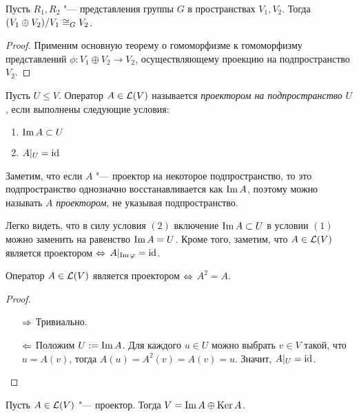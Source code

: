 \begin{proposition}
	Пусть $R_1, R_2$ "--- представления группы $G$ в пространствах $V_1, V_2$. Тогда $(V_1 \oplus V_2) / V_1 \cong_G V_2$.
\end{proposition}

\begin{proof}
	Применим основную теорему о гомоморфизме к гомоморфизму представлений $\phi: V_1 \oplus V_2 \to V_2$, осуществляющему проекцию на подпространство $V_2$.
\end{proof}

\begin{definition}
	Пусть $U \le V$. Оператор $A \in \mathcal L(V)$ называется \textit{проектором на подпространство} $U$, если выполнены следующие условия:
	\begin{enumerate}
		\item $\operatorname{Im} A \subset U$
		\item $A|_{U} = \mathrm{id}$
	\end{enumerate}

	Заметим, что если $A$ "--- проектор на некоторое подпространство, то это подпространство однозначно восстанавливается как $\operatorname{Im} A$, поэтому можно называть $A$ \textit{проектором}, не указывая подпространство.
\end{definition}

\begin{note}
	Легко видеть, что в силу условия $(2)$ включение $\operatorname{Im} A \subset U$ в условии $(1)$ можно заменить на равенство $\operatorname{Im} A = U$. Кроме того, заметим, что $A \in \mathcal L(V)$ является проектором $\Leftrightarrow$ $A|_{\operatorname{Im}\varphi} = \mathrm{id}$.
\end{note}

\begin{proposition}
	Оператор $A \in \mathcal L(V)$ является проектором $\Leftrightarrow$ $A^2 = A$.
\end{proposition}

\begin{proof}~
	\begin{itemize}
		\item[$\Rightarrow$] Тривиально.
		\item[$\Leftarrow$] Положим $U := \operatorname{Im}{A}$. Для каждого $u \in U$ можно выбрать $v \in V$ такой, что $u = A(v)$, тогда $A(u) = A^2(v) = A(v) = u$. Значит, $A|_U = \mathrm{id}$.\qedhere
	\end{itemize}
\end{proof}

\begin{proposition}
	Пусть $A \in \mathcal L(V)$ "--- проектор. Тогда $V = \operatorname{Im}{A} \oplus \operatorname{Ker}{A}$.
\end{proposition}

